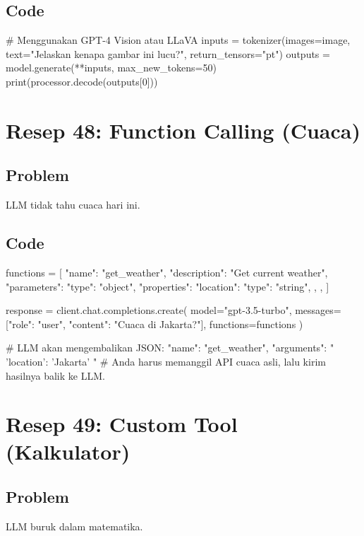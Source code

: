 \subsection*{Code}
\begin{codeblock}[language=Python]
# Menggunakan GPT-4 Vision atau LLaVA
inputs = tokenizer(images=image, text="Jelaskan kenapa gambar ini lucu?", return_tensors="pt")
outputs = model.generate(**inputs, max_new_tokens=50)
print(processor.decode(outputs[0]))
\end{codeblock}

\newpage

\section{Resep 48: Function Calling (Cuaca)}

\subsection*{Problem}
LLM tidak tahu cuaca hari ini.

\subsection*{Code}
\begin{codeblock}[language=Python]
functions = [
    {
        "name": "get_weather",
        "description": "Get current weather",
        "parameters": {
            "type": "object",
            "properties": {
                "location": {"type": "string"},
            },
        },
    }
]

response = client.chat.completions.create(
    model="gpt-3.5-turbo",
    messages=[{"role": "user", "content": "Cuaca di Jakarta?"}],
    functions=functions
)

# LLM akan mengembalikan JSON: { "name": "get_weather", "arguments": "{ 'location': 'Jakarta' }" }
# Anda harus memanggil API cuaca asli, lalu kirim hasilnya balik ke LLM.
\end{codeblock}

\newpage

\section{Resep 49: Custom Tool (Kalkulator)}

\subsection*{Problem}
LLM buruk dalam matematika.

